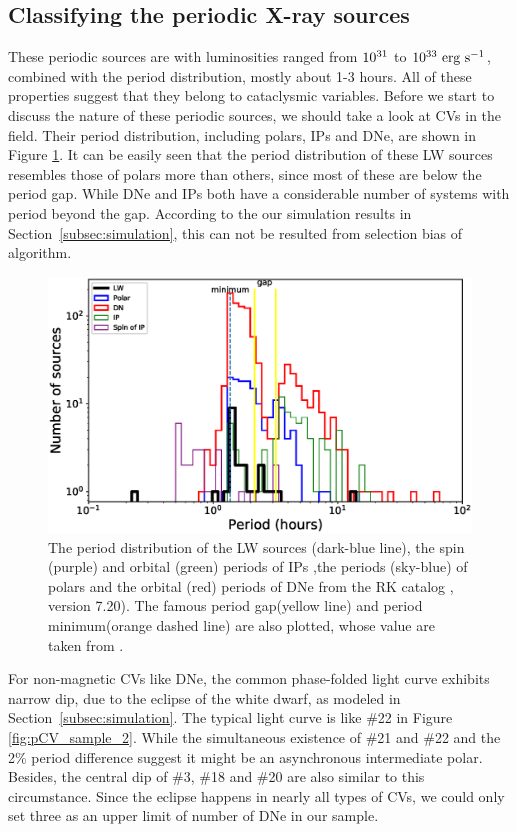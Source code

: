 \documentclass[fleqn,usenatbib]{mnras}
\begin{document}
\subsection{Classifying the periodic X-ray sources}
\label{subsec:class}
These periodic sources are with luminosities ranged from $\rm 10^{31}$ to $\rm 10^{33}~erg~s^{-1}$, combined with the period distribution, mostly about 1-3 hours. All of these properties suggest that they belong to cataclysmic variables. 
Before we start to discuss the nature of these periodic sources, we should take a look at CVs in the field. Their period distribution, including polars, IPs and DNe, are shown in Figure \ref{fig:N_P}.
It can be easily seen that the period distribution of these LW sources resembles those of polars more than others, since most of these are below the period gap. While DNe and IPs both have a considerable number of systems with period beyond the gap. According to the our simulation results in Section~\ref{subsec:simulation}, this can not be resulted from selection bias of algorithm. 

\begin{figure}
\centering
\includegraphics[scale=0.73]{./figure/CV/N_P.eps}
\caption{The period distribution of the LW sources (dark-blue line), the spin (purple) and orbital (green) periods of IPs ,the periods (sky-blue) of polars and the orbital (red) periods of DNe from the RK catalog \citep{2003A&A...404..301R}, version 7.20). The famous period gap(yellow line) and period minimum(orange dashed line) are also plotted, whose value are taken from \citep{2011ApJS..194...28K}.\label{fig:N_P}}
\end{figure}
For non-magnetic CVs like DNe, the common phase-folded light curve exhibits narrow dip, due to the eclipse of the white dwarf, as modeled in Section~\ref{subsec:simulation}. The typical light curve is like \#22 in Figure \ref{fig:pCV_sample_2}. 	While the simultaneous existence of \#21 and \#22 and the 2\% period difference suggest it might be an asynchronous intermediate polar. Besides, the central dip of \#3, \#18 and \#20 are also similar to this circumstance. Since the eclipse happens in nearly all types of CVs, we could only set three as an upper limit of number of DNe in our sample.
\end{document}
